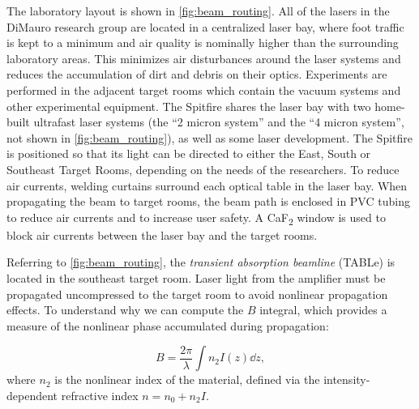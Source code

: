 The laboratory layout is shown in \cref{fig:beam_routing}. All of the lasers in the DiMauro research group are located in a centralized laser bay, where foot traffic is kept to a minimum and air quality is nominally higher than the surrounding laboratory areas. This minimizes air disturbances around the laser systems and reduces the accumulation of dirt and debris on their optics. Experiments are performed in the adjacent target rooms which contain the vacuum systems and other experimental equipment. The Spitfire shares the laser bay with two home-built ultrafast laser systems (the ``2 micron system'' and the ``4 micron system'', not shown in \cref{fig:beam_routing}), as well as some laser development. The Spitfire is positioned so that its light can be directed to either the East, South or Southeast Target Rooms, depending on the needs of the researchers. To reduce air currents, welding curtains surround each optical table in the laser bay. When propagating the beam to target rooms, the beam path is enclosed in PVC tubing to reduce air currents and to increase user safety. A CaF\textsubscript{2} window is used to block air currents between the laser bay and the target rooms.

Referring to \cref{fig:beam_routing}, the \textit{transient absorption beamline} (TABLe) is located in the southeast target room. Laser light from the amplifier must be propagated uncompressed to the target room to avoid nonlinear propagation effects. To understand why we can compute the $B$ integral, which provides a measure of the nonlinear phase accumulated during propagation: 

\begin{equation}
B = \frac{2 \pi}{\lambda} \int n_2 I(z) \dd{z},
\label{eqn:B-integral}
\end{equation}
where $n_2$ is the nonlinear index of the material, defined via the intensity-dependent refractive index $n = n_0 + n_2 I$.

